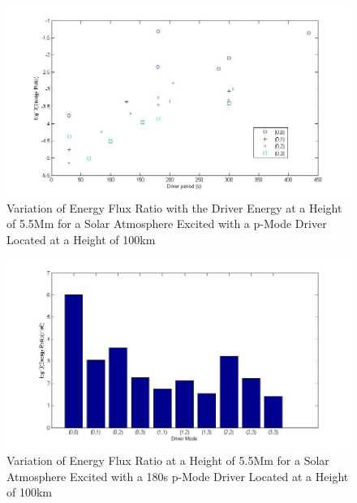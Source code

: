 \documentclass[final,1p]{elsarticle}
\begin{document}
\begin{figure}[h]
\includegraphics[scale=0.6]{imagesn/ratio_varoverdrve_eflux_vperiod_for modes_5p5Mm.jpg}
\caption{Variation of Energy Flux Ratio with the Driver Energy at a Height of 5.5Mm for a Solar Atmosphere Excited with a p-Mode Driver Located at a Height of 100km}
\end{figure}


\begin{figure}[h]
\includegraphics[scale=0.6]{imagesn/ratio_varoverdrve_eflux_vperiod_forallmodes_180s_5p5Mm.jpg}
\caption{Variation of Energy Flux Ratio at a Height of 5.5Mm for a Solar Atmosphere Excited with a 180s p-Mode Driver Located at a Height of 100km}
\end{figure}
\end{document}
